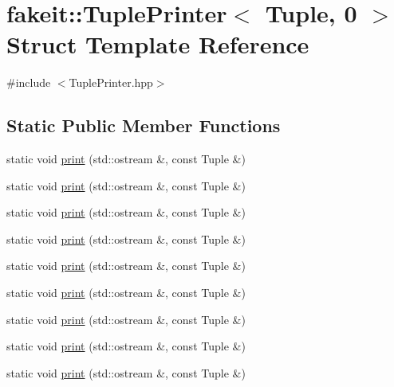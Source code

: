 \hypertarget{structfakeit_1_1TuplePrinter_3_01Tuple_00_010_01_4}{}\section{fakeit\+::Tuple\+Printer$<$ Tuple, 0 $>$ Struct Template Reference}
\label{structfakeit_1_1TuplePrinter_3_01Tuple_00_010_01_4}


{\ttfamily \#include $<$Tuple\+Printer.\+hpp$>$}

\subsection*{Static Public Member Functions}
\begin{DoxyCompactItemize}
\item 
static void \mbox{\hyperlink{structfakeit_1_1TuplePrinter_3_01Tuple_00_010_01_4_a7ca7f3fd3db9f8f91171e29abbdce335}{print}} (std\+::ostream \&, const Tuple \&)
\item 
static void \mbox{\hyperlink{structfakeit_1_1TuplePrinter_3_01Tuple_00_010_01_4_a7ca7f3fd3db9f8f91171e29abbdce335}{print}} (std\+::ostream \&, const Tuple \&)
\item 
static void \mbox{\hyperlink{structfakeit_1_1TuplePrinter_3_01Tuple_00_010_01_4_a7ca7f3fd3db9f8f91171e29abbdce335}{print}} (std\+::ostream \&, const Tuple \&)
\item 
static void \mbox{\hyperlink{structfakeit_1_1TuplePrinter_3_01Tuple_00_010_01_4_a7ca7f3fd3db9f8f91171e29abbdce335}{print}} (std\+::ostream \&, const Tuple \&)
\item 
static void \mbox{\hyperlink{structfakeit_1_1TuplePrinter_3_01Tuple_00_010_01_4_a7ca7f3fd3db9f8f91171e29abbdce335}{print}} (std\+::ostream \&, const Tuple \&)
\item 
static void \mbox{\hyperlink{structfakeit_1_1TuplePrinter_3_01Tuple_00_010_01_4_a7ca7f3fd3db9f8f91171e29abbdce335}{print}} (std\+::ostream \&, const Tuple \&)
\item 
static void \mbox{\hyperlink{structfakeit_1_1TuplePrinter_3_01Tuple_00_010_01_4_a7ca7f3fd3db9f8f91171e29abbdce335}{print}} (std\+::ostream \&, const Tuple \&)
\item 
static void \mbox{\hyperlink{structfakeit_1_1TuplePrinter_3_01Tuple_00_010_01_4_a7ca7f3fd3db9f8f91171e29abbdce335}{print}} (std\+::ostream \&, const Tuple \&)
\item 
static void \mbox{\hyperlink{structfakeit_1_1TuplePrinter_3_01Tuple_00_010_01_4_a7ca7f3fd3db9f8f91171e29abbdce335}{print}} (std\+::ostream \&, const Tuple \&)
\end{DoxyCompactItemize}


